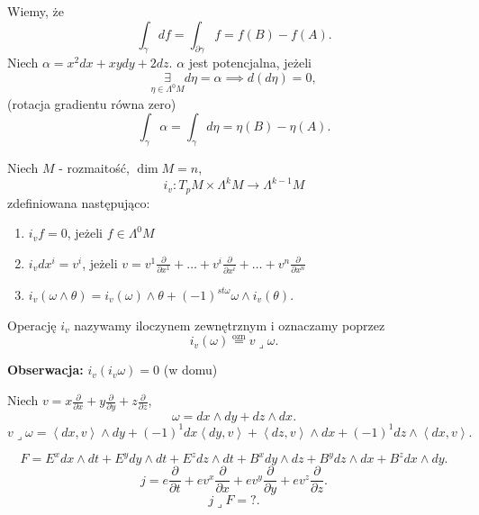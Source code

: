 \documentclass[../main.tex]{subfiles}
\begin{document}
Wiemy, że
\[
    \int_{\gamma}df = \int_{\partial\gamma}f = f(B) - f(A)
.\]
Niech $\alpha = x^2dx + xydy + 2dz$. $\alpha$ jest potencjalna, jeżeli
\[
    \underset{\eta\in \Lambda^0M}{\exists} d\eta = \alpha \implies d(d\eta) = 0
,\]
(rotacja gradientu równa zero)
\[
    \int_{\gamma}\alpha = \int_{\gamma}d\eta = \eta(B) - \eta(A)
.\]
\begin{definicja}
    Niech $M$ - rozmaitość, $\dim M = n$,\\
    \[
        i_v : T_pM \times \Lambda^kM\to \Lambda^{k-1}M
    \]
    zdefiniowana następująco:
    \begin{enumerate}
        \item $i_v f = 0$, jeżeli $f\in \Lambda^0M$
        \item  $i_v dx^i = v^i$, jeżeli $v = v^1 \frac{\partial }{\partial x^1} + \ldots + v^i \frac{\partial }{\partial x^i} + \ldots + v^n \frac{\partial }{\partial x^n} $
        \item $i_v(\omega\land \theta) = i_v(\omega)\land \theta + (-1)^{st \omega} \omega\land i_v(\theta)$.
    \end{enumerate}
    Operację $i_v$ nazywamy iloczynem zewnętrznym i oznaczamy poprzez
    \[
        i_v(\omega) \overset{\text{ozn}}{=} v \lrcorner \omega
    .\]
\end{definicja}
\textbf{Obserwacja:} $i_v(i_v\omega) = 0 $ (w domu)
\begin{przyklad}
    Niech $v = x \frac{\partial }{\partial x} + y \frac{\partial }{\partial y} + z \frac{\partial }{\partial z} $,
    \[
    \omega = dx\land dy + dz \land dx
    .\]
\[
    v \lrcorner \omega = \left<dx, v \right> \land dy + (-1)^1 dx\left<dy,v \right> + \left<dz, v \right>\land dx + (-1)^1 dz\land \left<dx, v \right>
.\]
\end{przyklad}
\begin{przyklad}
    \[
     F = E^xdx\land dt + E^ydy\land dt + E^z dz\land dt + B^x dy\land dz + B^ydz\land dx + B^zdx\land dy
    .\]
\[
j = e \frac{\partial }{\partial t} + ev^x \frac{\partial }{\partial x}  + ev^y \frac{\partial }{\partial y} + ev^z \frac{\partial }{\partial z}
.\]
\[
    j \lrcorner  F = ?
.\]
\end{przyklad}
\end{document}
